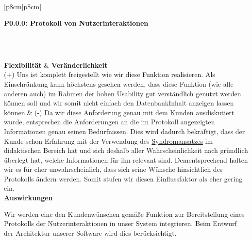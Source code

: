 \documentclass[enabledeprecatedfontcommands,fontsize=11pt,paper=a4,twoside]{scrartcl}
\newcounter{one}
\newcounter{two}[one]
\newcounter{three}[two]
\newcommand{\tone}{0\theone}
\newcommand{\ttwo}{0\thetwo}
\newcommand{\three}{\stepcounter{three}0\thethree}
\begin{document}
\\ \\ \\ \\%
\begin{tabular} {|p{8cm}|p{8cm}|}
	\hline
	 {\parbox{16cm}{\textbf{\hypertarget{bb}{P\tone.\ttwo.\three}: Protokoll von Nutzerinteraktionen}} }\\ \hline \hline
	\rule{0pt}{8ex}\\ [3ex] \hline
	\textbf{Flexibilität}  & \textbf{Veränderlichkeit} \\
	(+) Uns ist komplett freigestellt wie wir diese Funktion realisieren. Als Einschränkung kann höchstens gesehen werden, dass diese Funktion (wie alle anderen auch) im Rahmen der hohen Usability gut verständlich genutzt werden können soll und wir somit nicht einfach den DatenbankInhalt anzeigen lassen können.&
	(-) Da wir diese Anforderung genau mit dem Kunden ausdiskutiert wurde, entsprechen die Anforderungen an die im Protokoll angezeigten Informationen genau seinen Bedürfnissen. Dies wird dadurch bekräftigt, dass der Kunde schon Erfahrung mit der Verwendung des \hyperlink{Syndromansatz}{Syndromansatzes} im didaktischen Bereich hat und sich deshalb aller Wahrscheinlichkeit nach gründlich überlegt hat, welche Informationen für ihn relevant sind. Dementsprechend halten wir es für eher unwahrscheinlich, dass sich seine Wünsche hinsichtlich des Protokolls ändern werden. Somit stufen wir diesen Einflussfaktor als eher gering ein. \\ \hline
	 {\textbf{Auswirkungen}} \\
	 {\parbox{16cm}{Wir werden eine den Kundenwünschen gemäße Funktion zur Bereitstellung eines Protokolls der Nutzerinteraktionen in unser System integrieren. Beim Entwurf der Architektur unserer Software wird dies berücksichtigt.}}\\ \hline
\end{tabular}
\end{document}
